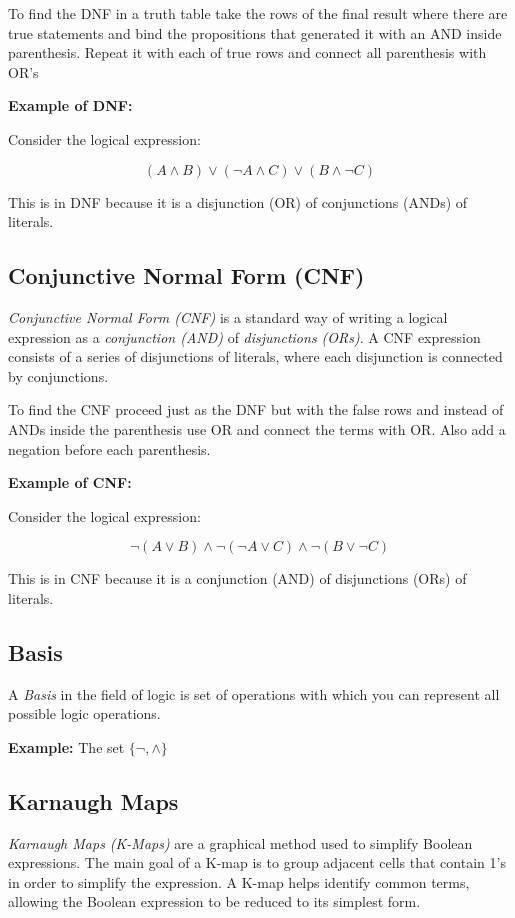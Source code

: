 To find the DNF in a truth table take the rows of the final result where there are
true statements and bind the propositions that generated it with an AND inside parenthesis.
Repeat it with each of true rows and connect all parenthesis with OR's

\textbf{Example of DNF:}

Consider the logical expression:

\[
	(A \land B) \lor (\neg A \land C) \lor (B \land \neg C)
\]

This is in DNF because it is a disjunction (OR) of conjunctions (ANDs) of literals.

\subsection{Conjunctive Normal Form (CNF)}

\emph{Conjunctive Normal Form (CNF)} is a standard way of writing a logical expression as a 
\emph{conjunction (AND)} of \emph{disjunctions (ORs)}. A CNF expression consists of a series of 
disjunctions of literals, where each disjunction is connected by conjunctions.

To find the CNF proceed just as the DNF but with the false rows and instead
of ANDs inside the parenthesis use OR and connect the terms with OR\@. 
Also add a negation before each parenthesis.

\textbf{Example of CNF:}

Consider the logical expression:

\[
	\neg (A \lor B) \land \neg (\neg A \lor C) \land \neg (B \lor \neg C)
\]

This is in CNF because it is a conjunction (AND) of disjunctions (ORs) of literals.

\subsection{Basis}

A \emph{Basis} in the field of logic is set of operations with which you can 
represent all possible logic operations.

\textbf{Example:} The set \(\{ \lnot, \land\}\)

\subsection{Karnaugh Maps}

\emph{Karnaugh Maps (K-Maps)} are a graphical method used to simplify Boolean expressions. 
The main goal of a K-map is to group adjacent cells that contain 1's in order to simplify the expression. 
A K-map helps identify common terms, allowing the Boolean expression to be reduced to its simplest form.

